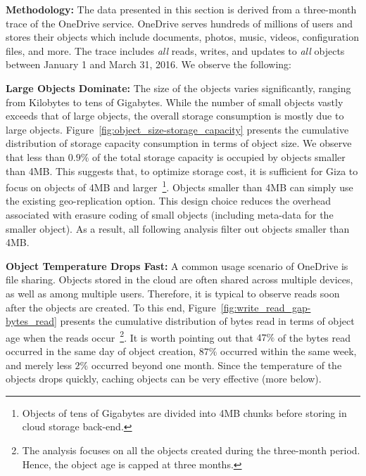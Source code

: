 {\bf Methodology:} The data presented in this section is derived from a three-month trace of the OneDrive service. OneDrive serves hundreds of millions of users and stores their objects which include documents, photos, music, videos, configuration files, and more. The trace includes {\em all} reads, writes, and updates to {\em all} objects between January 1 and March 31, 2016. We observe the following:

{\bf Large Objects Dominate:} The size of the objects varies significantly, ranging from Kilobytes to tens of Gigabytes. While the number of small objects vastly exceeds that of large objects, the overall storage consumption is mostly due to large objects. Figure~\ref{fig:object_size-storage_capacity} presents the cumulative distribution of storage capacity consumption in terms of object size. We observe that less than $0.9\%$ of the total storage capacity is occupied by objects smaller than 4MB. This suggests that, to optimize storage cost, it is sufficient for Giza to focus on objects of 4MB and larger~\footnote{Objects of tens of Gigabytes are divided into 4MB chunks before storing in cloud storage back-end.}. Objects smaller than 4MB can simply use the existing geo-replication option. This design choice reduces the overhead associated with erasure coding of small objects (including meta-data for the smaller object). As a result, all following analysis filter out objects smaller than 4MB.

{\bf Object Temperature Drops Fast:} A common usage scenario of OneDrive is file sharing. Objects stored in the cloud are often shared across multiple devices, as well as among multiple users. Therefore, it is typical to observe reads soon after the objects are created. To this end, Figure~\ref{fig:write_read_gap-bytes_read} presents the cumulative distribution of bytes read in terms of object age when the reads occur~\footnote{The analysis focuses on all the objects created during the three-month period. Hence, the object age is capped at three months.}. It is worth pointing out that $47\%$ of the bytes read occurred in the same day of object creation, $87\%$ occurred within the same week, and merely less $2\%$ occurred beyond one month. Since the temperature of the objects drops quickly, caching objects can be very effective (more below). 

